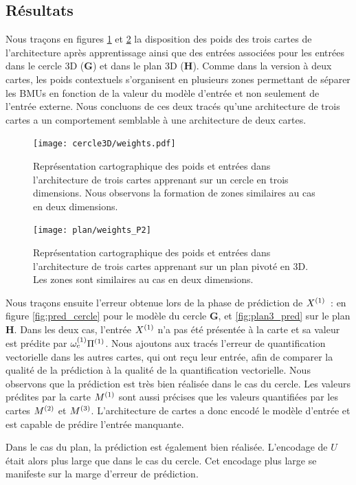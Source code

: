 \documentclass[../main]{subfiles}
\begin{document}
\subsection{Résultats}

Nous traçons en figures \ref{fig:w_cercle} et \ref{fig:w_plan3} la disposition des poids des trois cartes de l'architecture après apprentissage ainsi que des entrées associées pour les entrées dans le cercle 3D (\textbf{G}) et dans le plan 3D (\textbf{H}).
Comme dans la version à deux cartes, les poids contextuels s'organisent en plusieurs zones permettant de séparer les BMUs en fonction de la valeur du modèle d'entrée et non seulement de l'entrée externe.
Nous concluons de ces deux tracés qu'une architecture de trois cartes a un comportement semblable à une architecture de deux cartes.

\begin{figure}[h!]
	\centering\texttt{[image: cercle3D/weights.pdf]}
	\caption{Représentation cartographique des poids et entrées dans l'architecture de trois cartes apprenant sur un cercle en trois dimensions. Nous observons la formation de zones similaires au cas en deux dimensions. \label{fig:w_cercle}}
\end{figure}

\begin{figure}[h!]
	\centering\texttt{[image: plan/weights\_P2]}
	\caption{Représentation cartographique des poids et entrées dans l'architecture de trois cartes apprenant sur un plan pivoté en 3D. Les zones sont similaires au cas en deux dimensions. \label{fig:w_plan3}}
\end{figure}

Nous traçons ensuite l'erreur obtenue lors de la phase de prédiction de $X^{({1})}$~: en figure \ref{fig:pred_cercle} pour le modèle du cercle \textbf{G}, et \ref{fig:plan3_pred} sur le plan \textbf{H}.
Dans les deux cas, l'entrée $X^{({1})}$ n'a pas été présentée à la carte et sa valeur est prédite par $\omega_{e}^{({1})}{\Pi^{({1})}}$. Nous ajoutons aux tracés l'erreur de quantification vectorielle dans les autres cartes, qui ont reçu leur entrée, afin de comparer la qualité de la prédiction à la qualité de la quantification vectorielle.
Nous observons que la prédiction est très bien réalisée dans le cas du cercle. Les valeurs prédites par la carte $M^{({1})}$ sont aussi précises que les valeurs quantifiées par les cartes $M^{({2})}$ et $M^{({3})}$.
L'architecture de cartes a donc encodé le modèle d'entrée et est capable de prédire l'entrée manquante.

Dans le cas du plan, la prédiction est également bien réalisée. L'encodage de $U$ était alors plus large que dans le cas du cercle. Cet encodage plus large se manifeste sur la marge d'erreur de prédiction.
\end{document}
